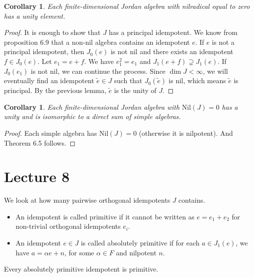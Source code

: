 \documentclass{article}
\newtheorem{corollary}[theorem]{Corollary}
\begin{document}
\begin{corollary}  
Each finite-dimensional Jordan algebra with nilradical equal to zero has a unity element.  
\end{corollary}  

\begin{proof}  
It is enough to show that $J$ has a principal idempotent. We know from proposition 6.9 that a non-nil algebra contains an idempotent $e$.  
If $e$ is not a principal idempotent, then $J_0(e)$ is not nil and there exists an idempotent $f \in J_0(e)$. Let $e_1 = e+f$. We have $e_1^2 = e_1$ and $J_1(e+f) \supsetneq J_1(e)$.  
If $J_0(e_1)$ is not nil, we can continue the process. Since $\dim J < \infty$, we will eventually find an idempotent $\tilde{e} \in J$ such that $J_0(\tilde{e})$ is nil, which means $\tilde{e}$ is principal. By the previous lemma, $\tilde{e}$ is the unity of $J$.  
\end{proof}  

\begin{corollary}  
Each finite-dimensional Jordan algebra with $\mathrm{Nil}(J)=0$ has a unity and is isomorphic to a direct sum of simple algebras.  
\end{corollary}  

\begin{proof}  
Each simple algebra has $\mathrm{Nil}(J)=0$ (otherwise it is nilpotent). And Theorem 6.5 follows.  
\end{proof}  

\section{Lecture 8}

We look at how many pairwise orthogonal idempotents $J$ contains.  

\begin{definition}  
\begin{itemize}  
    \item An idempotent is called primitive if it cannot be written as $e = e_1 + e_2$ for non-trivial orthogonal idempotents $e_i$.  
    \item An idempotent $e \in J$ is called absolutely primitive if for each $a \in J_1(e)$, we have $a = \alpha e + n$, for some $\alpha \in F$ and nilpotent $n$.  
\end{itemize}  
\end{definition}  

\begin{lemma}  
Every absolutely primitive idempotent is primitive.  
\end{lemma}  
\end{document}
